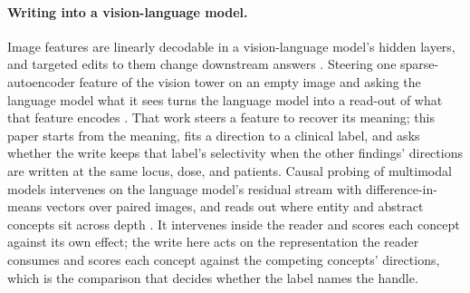 \paragraph{Writing into a vision-language model.}
Image features are linearly decodable in a vision-language model's hidden layers, and targeted edits to them change downstream answers \citep{rajaram2025lineofsight}. Steering one sparse-autoencoder feature of the vision tower on an empty image and asking the language model what it sees turns the language model into a read-out of what that feature encodes \citep{ferrando2026explain}. That work steers a feature to recover its meaning; this paper starts from the meaning, fits a direction to a clinical label, and asks whether the write keeps that label's selectivity when the other findings' directions are written at the same locus, dose, and patients. Causal probing of multimodal models intervenes on the language model's residual stream with difference-in-means vectors over paired images, and reads out where entity and abstract concepts sit across depth \citep{deng2026causal}. It intervenes inside the reader and scores each concept against its own effect; the write here acts on the representation the reader consumes and scores each concept against the competing concepts' directions, which is the comparison that decides whether the label names the handle.
